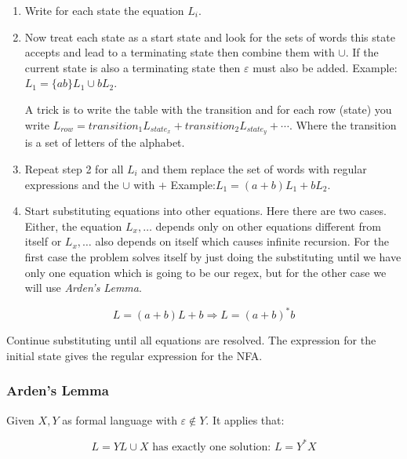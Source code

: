 \begin{enumerate}
\begin{enumerate}
    \item Write for each state the equation \(L_i\).
    
    \item Now treat each state as a start state and look for the sets of words this state accepts and lead 
          to a terminating state then combine them with \(\cup\). If the current state is also a terminating 
          state then \(\varepsilon\) must also be added. Example: \(L_1 = \{ab\}L_1 \cup b L_2\).

          A trick is to write the table with the transition and for each row (state) you write 
          \(L_{row} = transition_1 L_{state_x} + transition_2 L_{state_y} + \cdots \). Where the transition is 
          a set of letters of the alphabet.
          
    \item Repeat step 2 for all \(L_i\) and them replace the set of words with regular expressions and the 
           \(\cup\) with \(+\) Example:\(L_1 = (a+b)L_1 + b L_2\).
    
    \item Start substituting equations into other equations. Here there are two cases. Either, the  
          equation \(L_x, \dots\) depends only on other equations different from itself or  \(L_x, \dots\) also depends on 
          itself which causes infinite recursion. For the first case the problem solves itself by just 
          doing the substituting until we have only one equation which is going to be our regex, but for the 
          other case we will use \emph{Arden's Lemma}. 

\end{enumerate}

    \[
        L = (a + b) L + b \Rightarrow L = (a + b)^* b
    \]

    Continue substituting until all equations are resolved. The expression for the initial state gives 
    the regular expression for the NFA.

\end{enumerate}


\subsubsection{Arden's Lemma}

Given \(X,Y\) as formal language with \(\varepsilon \notin Y\). It applies that:

\[
    L = YL \cup X \text{ has exactly one solution: } L = Y^*X
\]

